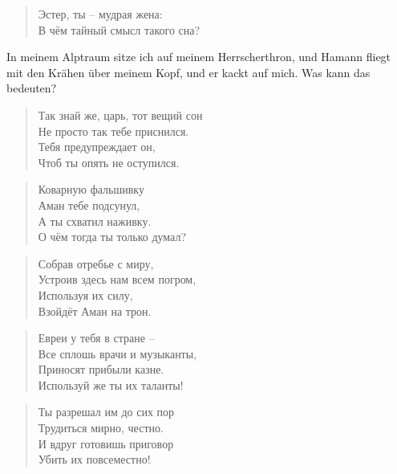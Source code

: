 \documentclass[12pt,a4paper,titlepage]{article}
\begin{document}
\begin{drama}
\begin{verse}
Эстер, ты -- мудрая жена:\\
В чём тайный смысл такого сна?\\
\end{verse}


\uespeaks
In meinem Alptraum sitze ich auf meinem Herrscherthron, und Hamann fliegt
mit den Krähen über meinem Kopf, und er kackt auf mich. Was kann das bedeuten?

\espeaks {}
\begin{verse}
Так знай же, царь, тот вещий сон\\
Не просто так тебе приснился.\\
Тебя предупреждает он,\\
Чтоб ты опять не оступился.\\
\end{verse}

\begin{verse}
Коварную фальшивку\\
Аман тебе подсунул,\\
А ты схватил наживку.\\
О чём тогда ты только думал?\\
\end{verse}

\begin{verse}
Собрав отребье с миру,\\
Устроив здесь нам всем погром,\\
Используя их силу,\\
Взойдёт Аман на трон.\\
\end{verse}

\begin{verse}
Евреи у тебя в стране --\\
Все сплошь врачи и музыканты,\\
Приносят прибыли казне.\\
Используй же ты их таланты!\\
\end{verse}

\begin{verse}
Ты разрешал им до сих пор\\
Трудиться мирно, честно.\\
И вдруг готовишь приговор\\
Убить их повсеместно!\\
\end{verse}



\end{drama}
\end{document}
